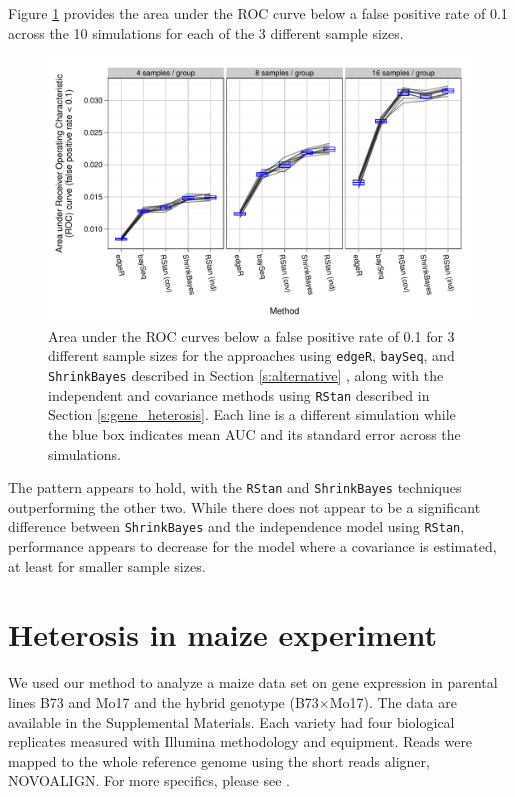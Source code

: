 \documentclass[useAMS,usenatbib,referee]{biom}
\begin{document}
Figure \ref{f:auc} provides the area under the ROC curve below a false positive rate of 0.1 across the 10 simulations for each of the 3 different sample sizes. 
\begin{figure}
\centerline{\includegraphics[width=\textwidth]{auc-facet-TRUE}}
\caption{Area under the ROC curves below a false positive rate of 0.1 for 3 different sample sizes for the approaches using {\tt edgeR}, {\tt baySeq},  and {\tt ShrinkBayes} described in Section \ref{s:alternative} , along with the independent and covariance methods using {\tt RStan} described in Section \ref{s:gene_heterosis}. Each line is a different simulation while the blue box indicates mean AUC and its standard error across the simulations.}
\label{f:auc}
\end{figure}
The pattern appears to hold, with the {\tt RStan} and {\tt ShrinkBayes} techniques outperforming the other two. While there does not appear to be a significant difference between {\tt ShrinkBayes} and the independence model using {\tt RStan}, performance appears to decrease for the model where a covariance is estimated, at least for smaller sample sizes.


\section{Heterosis in maize experiment}
\label{s:maize}

We used our method to analyze a maize data set on gene expression in parental lines B73 and Mo17 and the hybrid genotype (B73$\times$Mo17). The data are available in the Supplemental Materials. Each variety had four biological replicates measured with Illumina methodology and equipment. Reads were mapped to the whole reference genome using the short reads aligner, NOVOALIGN. For more specifics, please see \cite{paschold2012complementation}. 
\end{document}
